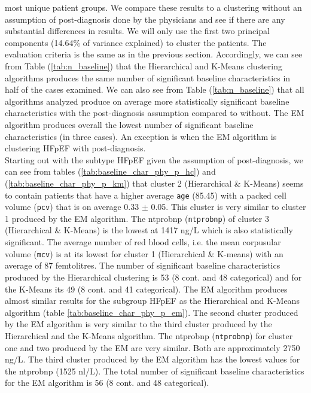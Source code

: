 \documentclass[../thesis.tex]{subfiles}
\begin{document}
\noindent most unique patient groups. We compare these results to a clustering without an assumption of post-diagnosis done by the physicians and see if there are any substantial differences in results. We will only use the first two principal components (14.64\% of variance explained) to cluster the patients. The evaluation criteria is the same as in the previous section. Accordingly, we can see from Table (\ref{tab:n_baseline}) that the Hierarchical and K-Means clustering algorithms produces the same number of significant baseline characteristics in half of the cases examined.  We can also see from Table (\ref{tab:n_baseline}) that all algorithms analyzed produce on average more statistically significant baseline characteristics with the post-diagnosis assumption compared to without. The EM algorithm produces overall the lowest number of significant baseline characteristics (in three cases). An exception is when the EM algorithm is clustering HFpEF with post-diagnosis.\\ 
\indent Starting out with the subtype HFpEF given the assumption of post-diagnosis, we can see from tables (\ref{tab:baseline_char_phy_p_hc}) and (\ref{tab:baseline_char_phy_p_km}) that cluster 2 (Hierarchical \& K-Means) seems to contain patients that have a higher average \texttt{age} (85.45) with a packed cell volume (\texttt{pcv}) that is on average 0.33 $\pm$ 0.05. This cluster is very similar to cluster 1 produced by the EM algorithm. The ntprobnp (\texttt{ntprobnp}) of cluster 3 (Hierarchical \& K-Means) is the lowest at 1417 ng/L which is also statistically significant. The average number of red blood cells, i.e. the mean corpusular volume (\texttt{mcv}) is at its lowest for cluster 1 (Hierarchical \& K-means) with an average of 87 femtolitres. The number of significant baseline characteristics produced by the Hierarchical clustering is 53 (8 cont. and 48 categorical) and for the K-Means its 49 (8 cont. and 41 categorical). The EM algorithm produces almost similar results for the subgroup HFpEF as the Hierarchical and K-Means algorithm (table \ref{tab:baseline_char_phy_p_em}). The second cluster produced by the EM algorithm is very similar to the third cluster produced by the Hierarchical and the K-Means algorithm. The ntprobnp (\texttt{ntprobnp}) for cluster one and two produced by the EM are very similar. Both are approximately 2750 ng/L. The third cluster produced by the EM algorithm has the lowest values for the ntprobnp (1525 nl/L). The total number of significant baseline characteristics for the EM algorithm is 56 (8 cont. and 48 categorical). \\ 
\end{document}
